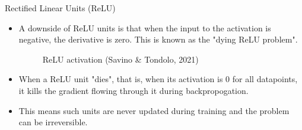 \begin{frame} {Rectified Linear Units (ReLU)}
  \begin{itemize}
  \item A downside of ReLU units is that when the input to the activation is negative, the derivative is zero. This is known as the "dying ReLU problem".
    \begin{figure}
      \centering
        \caption{ReLU activation (Savino \& Tondolo, 2021)}
    \end{figure}
    \item When a ReLU unit "dies", that is, when its activation is 0 for all datapoints, it kills the gradient flowing through it during backpropogation.
    \item This means such units are never updated during training and the problem can be irreversible.
   
  \end{itemize}
\end{frame}

